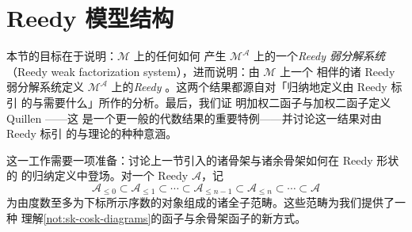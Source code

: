 
\providecommand{\llsq}{\mathrel{\square}}%
\providecommand{\rvW}{\mathbf{W}}  %
\providecommand{\rvC}{\mathbf{C}}  %
\providecommand{\rvF}{\mathbf{F}}  %
\providecommand{\Cat}{\mathcal{C}at}%
\providecommand{\sSet}{s\mathcal{S}et}%
\providecommand{\wlim}{\operatorname{lim}}%
\providecommand{\wcolim}{\operatorname{colim}}%
\providecommand{\lan}{\operatorname{lan}}%
\providecommand{\ran}{\operatorname{ran}}%

\section{Reedy 模型结构}\label{sec:the-reedy-model-structure}

本节的目标在于说明：$\mathcal{M}$ 上的任何\trWeakFactorizationSystem{}如何
产生 $\mathcal{M}^{\mathcal{A}}$ 上的一个\emph{Reedy 弱分解系统}（Reedy weak
factorization system），进而说明：由 $\mathcal{M}$ 上一个\trModelStructure{}%
相伴的诸 Reedy 弱分解系统定义 $\mathcal{M}^{\mathcal{A}}$ 上的\emph{Reedy
\trModelStructure}。这两个结果都源自对「归纳地定义由 Reedy \trCategory{}标引
的\trFunctor{}与\trNaturalTransformation{}需要什么」所作的分析。最后，我们证
明加权\trLimit{}二函子与加权\trColimit{}二函子定义 Quillen \trBifunctor——这
是一个更一般的代数结果的重要特例——并讨论这一结果对由 Reedy \trCategory{}标引
的\trHomotopyLimit{}与\trHomotopyColimit{}理论的种种意涵。

这一工作需要一项准备：讨论上一节引入的诸骨架与诸余骨架如何在 Reedy 形状的%
\trDiagram{}的归纳定义中登场。对一个 Reedy \trCategory{} $\mathcal{A}$，记
\[
\mathcal{A}_{\le 0}\subset\mathcal{A}_{\le 1}\subset\cdots\subset
\mathcal{A}_{\le n-1}\subset\mathcal{A}_{\le n}\subset\cdots\subset\mathcal{A}
\]
为由度数至多为下标所示序数的对象组成的诸全子范畴。这些范畴为我们提供了一种
理解\cref{not:sk-cosk-diagrams}的\trSkeleton{}函子与余骨架函子的新方式。

